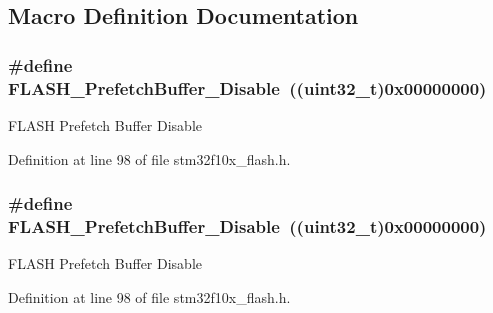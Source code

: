 \subsection{Macro Definition Documentation}
\subsubsection[{\texorpdfstring{F\+L\+A\+S\+H\+\_\+\+Prefetch\+Buffer\+\_\+\+Disable}{FLASH_PrefetchBuffer_Disable}}]{\setlength{\rightskip}{0pt plus 5cm}\#define F\+L\+A\+S\+H\+\_\+\+Prefetch\+Buffer\+\_\+\+Disable~(({\bf uint32\+\_\+t})0x00000000)}\hypertarget{group___prefetch___buffer___enable___disable_ga2feb631ad85449f83517f05aaf4ba26c}{}\label{group___prefetch___buffer___enable___disable_ga2feb631ad85449f83517f05aaf4ba26c}
F\+L\+A\+SH Prefetch Buffer Disable 

Definition at line 98 of file stm32f10x\+\_\+flash.\+h.

\subsubsection[{\texorpdfstring{F\+L\+A\+S\+H\+\_\+\+Prefetch\+Buffer\+\_\+\+Disable}{FLASH_PrefetchBuffer_Disable}}]{\setlength{\rightskip}{0pt plus 5cm}\#define F\+L\+A\+S\+H\+\_\+\+Prefetch\+Buffer\+\_\+\+Disable~(({\bf uint32\+\_\+t})0x00000000)}\hypertarget{group___prefetch___buffer___enable___disable_ga2feb631ad85449f83517f05aaf4ba26c}{}\label{group___prefetch___buffer___enable___disable_ga2feb631ad85449f83517f05aaf4ba26c}
F\+L\+A\+SH Prefetch Buffer Disable 

Definition at line 98 of file stm32f10x\+\_\+flash.\+h.

